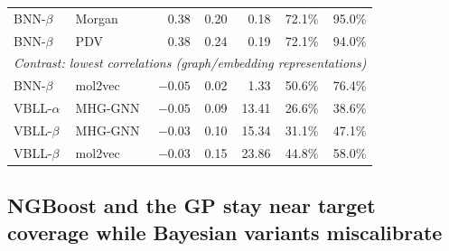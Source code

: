 \begin{table}[htbp]
\begin{tabular}{llrrrrr}
BNN-$\beta$    & Morgan          & 0.38 & 0.20 & 0.18 & 72.1\% & 95.0\% \\
BNN-$\beta$    & PDV             & 0.38 & 0.24 & 0.19 & 72.1\% & 94.0\% \\
\midrule
\multicolumn{7}{l}{\textit{Contrast: lowest correlations (graph/embedding representations)}} \\
\midrule
BNN-$\beta$ & mol2vec & $-0.05$ & 0.02 & 1.33 & 50.6\% & 76.4\% \\
VBLL-$\alpha$ & MHG-GNN & $-0.05$ & 0.09 & 13.41 & 26.6\% & 38.6\% \\
VBLL-$\beta$ & MHG-GNN & $-0.03$ & 0.10 & 15.34 & 31.1\% & 47.1\% \\
VBLL-$\beta$ & mol2vec & $-0.03$ & 0.15 & 23.86 & 44.8\% & 58.0\% \\
\bottomrule
\end{tabular}
\end{table}

\subsection{NGBoost and the GP stay near target coverage while Bayesian variants miscalibrate}

